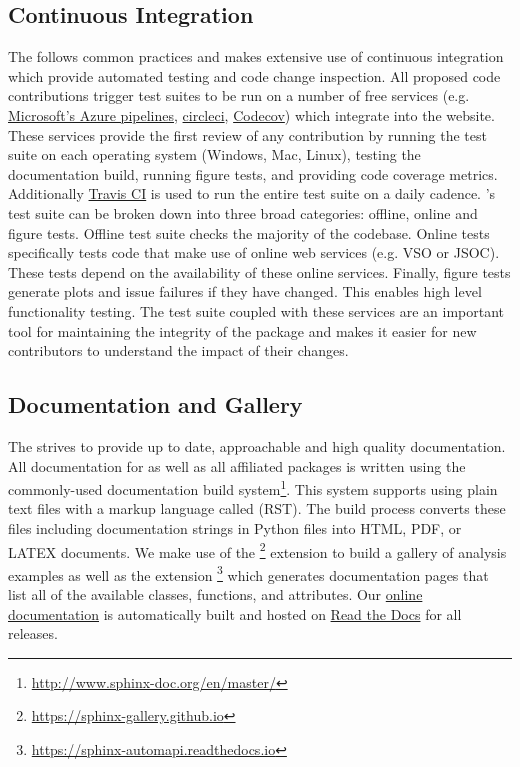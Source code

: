 \subsection{Continuous Integration}
The \sunpyproj follows common practices and makes extensive use of continuous integration which provide automated testing and code change inspection.
All proposed code contributions trigger test suites to be run on a number of free services (e.g.
\href{https://azure.microsoft.com/en-gb/services/devops/pipelines/}{Microsoft's Azure pipelines},
\href{https://circleci.com}{circleci},
\href{https://codecov.io/}{Codecov}) which integrate into the \github website.
These services provide the first review of any contribution by running the test suite on each operating system (Windows, Mac, Linux), testing the documentation build, running figure tests, and providing code coverage metrics.
Additionally \href{https://travis-ci.org}{Travis CI} is used to run the entire test suite on a daily cadence.
\sunpypkg's test suite can be broken down into three broad categories: offline, online and figure tests.
Offline test suite checks the majority of the codebase.
Online tests specifically tests code that make use of online web services (e.g. VSO or JSOC).
These tests depend on the availability of these online services.
Finally, figure tests generate plots and issue failures if they have changed.
This enables high level functionality testing.
The \sunpypkg test suite coupled with these services are an important tool for maintaining the integrity of the package and makes it easier for new contributors to understand the impact of their changes.

\subsection{Documentation and Gallery}
The \sunpyproj strives to provide up to date, approachable and high quality documentation.
All documentation for \sunpypkg as well as all affiliated packages is written using the commonly-used  documentation build system\footnote{\url{http://www.sphinx-doc.org/en/master/}}.
This system supports using plain text files with a markup language called  (RST).
The build process converts these files including documentation strings in Python files into HTML, PDF, or LATEX documents.
We make use of the \footnote{\url{https://sphinx-gallery.github.io}} extension to build a gallery of analysis examples as well as the extension \footnote{\url{https://sphinx-automapi.readthedocs.io}} which generates documentation pages that list all of the available classes, functions, and attributes.
Our \href{http://docs.sunpy.org/en/stable/}{online documentation} is automatically built and hosted on \href{https://readthedocs.org/}{Read the Docs} for all releases.
